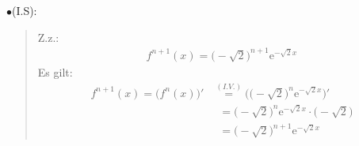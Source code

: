\newpage
\noindent
$ \bullet $\;\;(I.S):\\
\begin{quote}
	Z.z.:\\
	\begin{align*}
	f^{n+1}(x)=\big(-\sqrt{2}\big)^{n+1}\mathrm{e}^{-\sqrt{2}x}
	\end{align*}
	Es gilt:\\
	\begin{align*}
	f^{n+1}(x)=\big(f^{n}(x)\big)'&\overset{(I.V.)}{=}\bigg(\big(-\sqrt{2}\big)^n\mathrm{e}^{-\sqrt{2}x}\bigg)'\\
	&\;\;=\big(-\sqrt{2}\big)^n\mathrm{e}^{-\sqrt{2}x}\cdot \big(-\sqrt{2}\big)\\
	&\;\;=\big(-\sqrt{2}\big)^{n+1}\mathrm{e}^{-\sqrt{2}x}\boxed{}
	\end{align*}
\end{quote}
